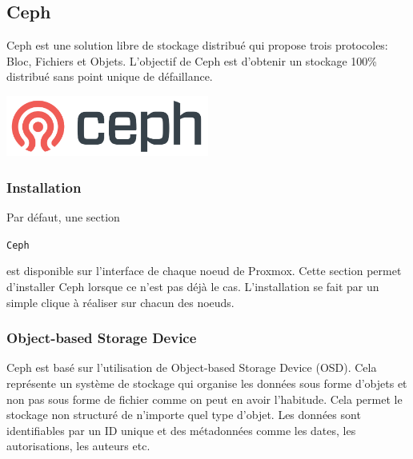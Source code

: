 \documentclass[12pt, a4paper, twoside]{article}
\begin{document}
\subsection{Ceph}
\noindent%
\begin{minipage}{.7\textwidth}%
\gls{Ceph} est une solution libre de stockage distribué qui propose trois protocoles: Bloc, Fichiers et Objets.
L'objectif de \gls{Ceph} est d'obtenir un stockage 100\% distribué sans point unique de défaillance.

\end{minipage}%
\hfill
\begin{minipage}{.3\textwidth}%
\begin{center}
\includegraphics[width=0.5\textwidth]{src/logo_ceph.png}
\end{center}
\end{minipage}%

\subsubsection{Installation}
Par défaut, une section \begin{code}\texttt{\gls{Ceph}}\end{code} est disponible sur l'interface de chaque noeud de \gls{Proxmox}. 
Cette section permet d'installer \gls{Ceph} lorsque ce n'est pas déjà le cas.
L'installation se fait par un simple clique à réaliser sur chacun des noeuds.

\subsubsection{Object-based Storage Device}
\gls{Ceph} est basé sur l'utilisation de Object-based Storage Device (\gls{OSD}).
Cela représente un système de stockage qui organise les données sous forme d'objets et non pas sous forme de fichier comme on peut en avoir l'habitude.
Cela permet le stockage non structuré de n'importe quel type d'objet.
Les données sont identifiables par un ID unique et des métadonnées comme les dates, les autorisations, les auteurs etc.
\end{document}
